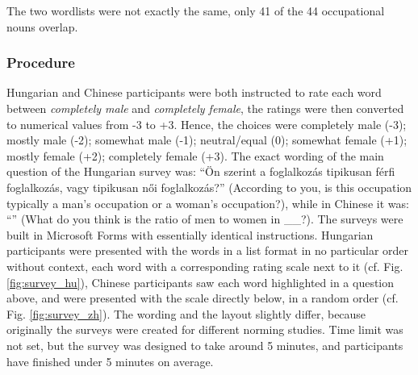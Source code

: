 \documentclass[11pt]{article}
\newcommand{\zh}[1]{\simplifiedchinesefont{#1}\rmfamily}
\begin{document}
The two wordlists were not exactly the same, only 41 of the 44 occupational nouns overlap.

\subsubsection{Procedure}

Hungarian and Chinese participants were both instructed to rate each word between \textit{completely male} and \textit{completely female}, the ratings were then converted to numerical values from -3 to +3. Hence, the choices were completely male (-3); mostly male (-2); somewhat male (-1); neutral/equal (0); somewhat female (+1); mostly female (+2); completely female (+3). The exact wording of the main question of the Hungarian survey was: ``Ön szerint a foglalkozás tipikusan férfi foglalkozás, vagy tipikusan női foglalkozás?'' (According to you, is this occupation typically a man's occupation or a woman's occupation?), while in Chinese it was: ``\zh{对于\hspace{0pt}XX\hspace{0pt}这个职业，\hspace{0pt}您\hspace{0pt}认为\hspace{0pt}通常\hspace{0pt}担\hspace{0pt}任该\hspace{0pt}职业\hspace{0pt}的\hspace{0pt}男女\hspace{0pt}性别\hspace{0pt}比例\hspace{0pt}是\hspace{0pt}多少？}'' (What do you think is the ratio of men to women in \_\_?). The surveys were built in Microsoft Forms with essentially identical instructions. Hungarian participants were presented with the words in a list format in no particular order without context, each word with a corresponding rating scale next to it (cf. Fig. \ref{fig:survey_hu}), Chinese participants saw each word highlighted in a question above, and were presented with the scale directly below, in a random order (cf. Fig. \ref{fig:survey_zh}). The wording and the layout slightly differ, because originally the surveys were created for different norming studies. Time limit was not set, but the survey was designed to take around 5 minutes, and participants have finished under 5 minutes on average.
\end{document}

